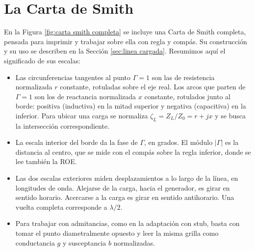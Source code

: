 \section{La Carta de Smith}\label{app:carta smith}

En la Figura \ref{fig:carta smith completa} se incluye una Carta de Smith completa, pensada para imprimir y trabajar sobre ella con regla y compás. Su construcción y su uso se describen en la Sección \ref{sec:linea cargada}. Resumimos aquí el significado de sus escalas:
\begin{itemize}
    \item Las circunferencias tangentes al punto $\Gamma=1$ son las de resistencia normalizada $r$ constante, rotuladas sobre el eje real. Los arcos que parten de $\Gamma=1$ son los de reactancia normalizada $x$ constante, rotulados junto al borde: positiva (inductiva) en la mitad superior y negativa (capacitiva) en la inferior. Para ubicar una carga se normaliza $\zeta_L=Z_L/Z_0=r+jx$ y se busca la intersección correspondiente.
    \item La escala interior del borde da la fase de $\Gamma$, en grados. El módulo $|\Gamma|$ es la distancia al centro, que se mide con el compás sobre la regla inferior, donde se lee también la ROE.
    \item Las dos escalas exteriores miden desplazamientos a lo largo de la línea, en longitudes de onda. Alejarse de la carga, hacia el generador, es girar en sentido horario. Acercarse a la carga es girar en sentido antihorario. Una vuelta completa corresponde a $\lambda/2$.
    \item Para trabajar con admitancias, como en la adaptación con stub, basta con tomar el punto diametralmente opuesto y leer la misma grilla como conductancia $g$ y susceptancia $b$ normalizadas.
\end{itemize}

